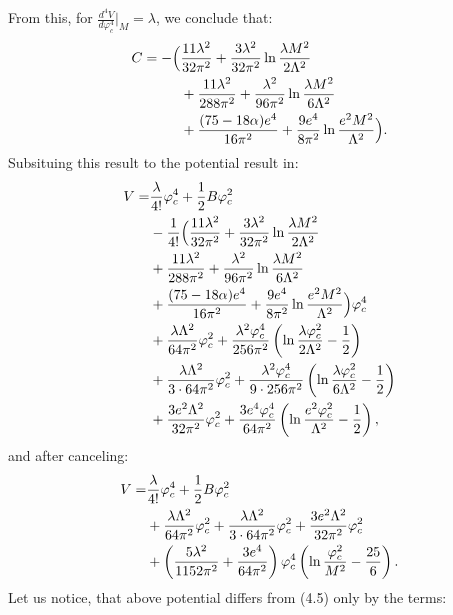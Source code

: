From this, for $\frac{d^4V}{d\varphi_c^4}\Big|_M=\lambda$, we conclude that:
\begin{align}
C = -\Big(
&\frac{11\lambda^2}{32\pi^2}+\frac{3\lambda^2}{32\pi^2}\ln\frac{\lambda M^2}{2\Lambda^2}\notag \\
&+\frac{11\lambda^2}{288\pi^2}+\frac{\lambda^2}{96\pi^2}\ln\frac{\lambda M^2}{6\Lambda^2}\notag \\
&+\frac{(75-18\alpha)e^4}{16\pi^2}+\frac{9e^4}{8\pi^2}\ln\frac{e^2M^2}{\Lambda^2}
\Big).
\end{align}
Subsituing this result to the potential result in:
\begin{align}
V=&\frac{\lambda}{4!}\varphi_c^4+\frac{1}{2}B\varphi_c^2 \notag \\
&-\frac{1}{4!}\Big(
\frac{11\lambda^2}{32\pi^2}+\frac{3\lambda^2}{32\pi^2}\ln\frac{\lambda M^2}{2\Lambda^2}\notag \\
&+\frac{11\lambda^2}{288\pi^2}+\frac{\lambda^2}{96\pi^2}\ln\frac{\lambda M^2}{6\Lambda^2}\notag \\
&+\frac{(75-18\alpha)e^4}{16\pi^2}+\frac{9e^4}{8\pi^2}\ln\frac{e^2M^2}{\Lambda^2}
\Big)\varphi_c^4 \notag \\
&+\frac{\lambda\Lambda^2}{64\pi^2}\varphi_c^2+\frac{\lambda^2\varphi_c^4}{256\pi^2}
\left(\ln\frac{\lambda\varphi_c^2}{2\Lambda^2}-\frac{1}{2}\right)  \notag \\
&+\frac{\lambda\Lambda^2}{3\cdot 64\pi^2}\varphi_c^2+\frac{\lambda^2\varphi_c^4}{9\cdot 256\pi^2}
\left(\ln\frac{\lambda\varphi_c^2}{6\Lambda^2}-\frac{1}{2}\right)  \notag \\
&+\frac{3e^2\Lambda^2}{32\pi^2}\varphi_c^2+\frac{3e^4\varphi_c^4}{64\pi^2}
\left(\ln\frac{e^2\varphi_c^2}{\Lambda^2}-\frac{1}{2}\right),
\end{align}
and after canceling:
\begin{align}
V = &\frac{\lambda}{4!}\varphi_c^4+\frac{1}{2}B\varphi_c^2  \notag \\
&+\frac{\lambda\Lambda^2}{64\pi^2}\varphi_c^2+
\frac{\lambda\Lambda^2}{3\cdot 64\pi^2}\varphi_c^2+
\frac{3e^2\Lambda^2}{32\pi^2}\varphi_c^2  \notag \\
&+\left(\frac{5\lambda^2}{1152\pi^2}+\frac{3e^4}{64\pi^2}\right)\varphi_c^4
\left(\ln\frac{\varphi_c^2}{M^2}-\frac{25}{6}\right).
\end{align}
Let us notice, that above potential differs from \cite{Coleman1973}(4.5) only by the terms:
